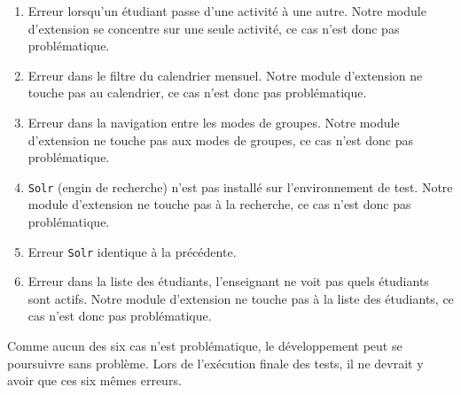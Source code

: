 \begin{enumerate}
  \item Erreur lorsqu'un étudiant passe d'une activité à une autre.
        Notre module d'extension se concentre sur une seule activité, ce cas n'est donc pas problématique.
        
  \item Erreur dans le filtre du calendrier mensuel.
        Notre module d'extension ne touche pas au calendrier, ce cas n'est donc pas problématique.
        
  \item Erreur dans la navigation entre les modes de groupes.
        Notre module d'extension ne touche pas aux modes de groupes, ce cas n'est donc pas problématique.
        
  \item \texttt{Solr} (engin de recherche) n'est pas installé sur l'environnement de test.
        Notre module d'extension ne touche pas à la recherche, ce cas n'est donc pas problématique.
        
  \item Erreur \texttt{Solr} identique à la précédente.
  
  \item Erreur dans la liste des étudiants, l'enseignant ne voit pas quels étudiants sont actifs.
        Notre module d'extension ne touche pas à la liste des étudiants, ce cas n'est donc pas problématique.
\end{enumerate}

Comme aucun des six cas n'est problématique, le développement peut se poursuivre sans problème.
Lors de l'exécution finale des tests, il ne devrait y avoir que ces six mêmes erreurs.


